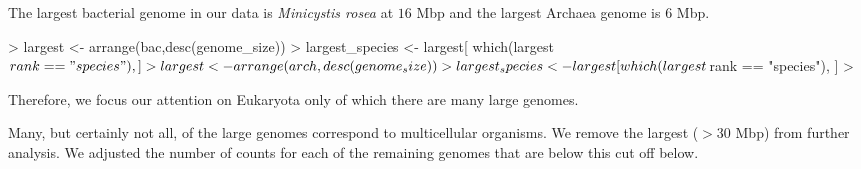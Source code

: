 \documentclass{article}
\begin{document}
The largest bacterial genome in our data is {\em Minicystis rosea} at $16$ Mbp and the largest Archaea genome
is $6$ Mbp.
\begin{Schunk}
\begin{Sinput}
> largest <- arrange(bac,desc(genome_size))
> largest_species <- largest[ which(largest$rank == "species"), ]
> largest <- arrange(arch,desc(genome_size))
> largest_species <- largest[ which(largest$rank == "species"), ]
> 
\end{Sinput}
\end{Schunk}

Therefore, we focus our attention on Eukaryota only of which there are many large genomes.

\begin{Schunk}
\end{Schunk}

Many, but certainly not all, of the large genomes correspond to multicellular organisms. 
We remove the largest ($>30$ Mbp)  from further analysis.
We adjusted the number of counts for each of the remaining genomes that are below this cut off below.
\end{document}
